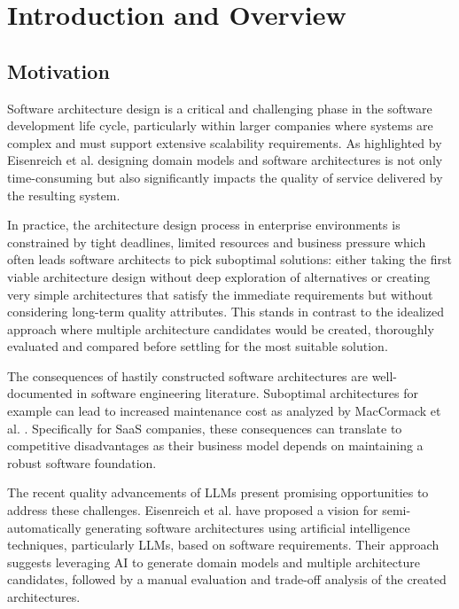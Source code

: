 
\chapter{Introduction and Overview}\label{chapter:introduction}

\section{Motivation}
Software architecture design is a critical and challenging phase in the software development life cycle, particularly within larger companies where systems are complex and must support extensive scalability requirements. As highlighted by Eisenreich et al. \autocite{eisenreich2024} designing domain models and software architectures is not only time-consuming but also significantly impacts the quality of service delivered by the resulting system.

In practice, the architecture design process in enterprise environments is constrained by tight deadlines, limited resources and business pressure which often leads software architects to pick suboptimal solutions: either taking the first viable architecture design without deep exploration of alternatives or creating very simple architectures that satisfy the immediate requirements but without considering long-term quality attributes. This stands in contrast to the idealized approach where multiple architecture candidates would be created, thoroughly evaluated and compared before settling for the most suitable solution. 

The consequences of hastily constructed software architectures are well-documented in software engineering literature. Suboptimal architectures for example can lead to increased maintenance cost as analyzed by MacCormack et al. \autocite{MACCORMACK2016170}. Specifically for SaaS companies, these consequences can translate to competitive disadvantages as their business model depends on maintaining a robust software foundation. 

The recent quality advancements of LLMs present promising opportunities to address these challenges. Eisenreich et al. \cite{eisenreich2024} have proposed a vision for semi-automatically generating software architectures using artificial intelligence techniques, particularly LLMs, based on software requirements. Their approach suggests leveraging AI to generate domain models and multiple architecture candidates, followed by a manual evaluation and trade-off analysis of the created architectures. 

